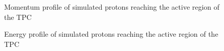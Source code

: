 \begin{figure}[!ht]
  \begin{minipage}[t]{0.48\textwidth}
    \begin{adjustbox}{max totalsize={\textwidth}{.35\textheight}, center}
      
    \end{adjustbox}
    \caption{Momentum profile of simulated protons reaching the active region of the TPC}
    \label{fig:MCTPC}
  \end{minipage}
  \hspace{0.3cm}
  \begin{minipage}[t]{0.48\textwidth}
    \begin{adjustbox}{max totalsize={\textwidth}{.35\textheight}, center}
      
    \end{adjustbox}
    \caption{Energy profile of simulated protons reaching the active region of the TPC}
    \label{fig:MCKE}
  \end{minipage}	
\end{figure}





